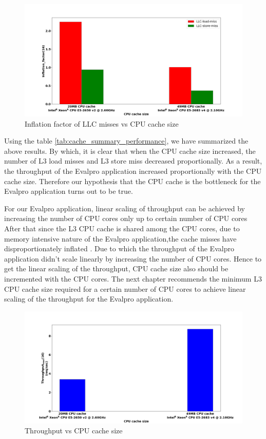 \documentclass{iitbreport}
\begin{document}
\begin{figure}[!htb]
  \centering
  \includegraphics[width=\linewidth]{Images/llc-misses_vs_cache_size.png}
  \caption{Inflation factor of LLC misses vs CPU cache size }
  \label{cache_inflation_relation}
\end{figure}


Using the table \ref{tab:cache_summary_performance}, we have summarized the above results. By which, it is clear that when the CPU cache size increased, the number of L3 load misses and L3 store miss decreased proportionally. As a result, the throughput of the Evalpro application increased proportionally with the CPU cache size. Therefore our hypothesis that the  CPU cache is the bottleneck for the Evalpro application turns out to be true.

For our Evalpro application, linear scaling of throughput can be achieved by increasing the number of CPU cores only up to certain number of CPU cores After that since the L3 CPU cache is shared among the CPU cores,  due to memory intensive nature of the Evalpro application,the cache misses have disproportionately inflated . Due to which the throughput of the Evalpro application didn't scale linearly by increasing the number of CPU cores. Hence to get the linear scaling of the throughput, CPU cache size also should be incremented with the CPU cores. The next chapter recommends the minimum L3 CPU cache size required for a certain number of CPU cores to achieve linear scaling of the throughput for the Evalpro application.

\begin{figure}[!htb]
  \centering
  \includegraphics[width=\linewidth]{Images/throughput_vs_cache_size.png}
  \caption{Throughput vs CPU cache size }
  \label{throughput_cache_graph}
\end{figure}
\end{document}
